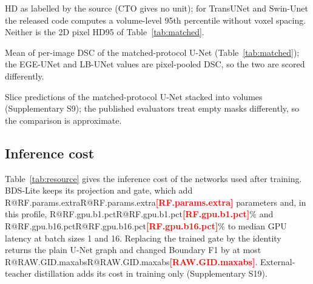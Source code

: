 \documentclass[fleqn,10pt,lineno]{wlpeerj}
\makeatletter
\newcommand{\R}[1]{\ifcsname R@#1\endcsname\csname R@#1\endcsname\else\textbf{\textcolor{red}{[#1]}}\fi}
\makeatother
\begin{document}
\begin{table}[!tb]
\centering
\begin{threeparttable}
{\small}
\begin{tablenotes}[flushleft]\footnotesize
\item[a] HD as labelled by the source (CTO gives no unit); for TransUNet and Swin-Unet the released code computes a volume-level 95th percentile without voxel spacing. Neither is the 2D pixel HD95 of Table~\ref{tab:matched}.
\item[b] Mean of per-image DSC of the matched-protocol U-Net (Table~\ref{tab:matched}); the EGE-UNet and LB-UNet values are pixel-pooled DSC, so the two are scored differently.
\item[c] Slice predictions of the matched-protocol U-Net stacked into volumes (Supplementary S9); the published evaluators treat empty masks differently, so the comparison is approximate.
\end{tablenotes}
\caption{\label{tab:published}Published results under their own protocols, and scores of the plain U-Net of this study (DSC on a 0--1 scale; dashes: not reported or not listed).}
\end{threeparttable}
\end{table}

\subsection*{Inference cost}
Table~\ref{tab:resource} gives the inference cost of the networks used after training. BDS-Lite keeps its projection and gate, which add \R{RF.params.extra} parameters and, in this profile, \R{RF.gpu.b1.pct}\% and \R{RF.gpu.b16.pct}\% to median GPU latency at batch sizes 1 and 16. Replacing the trained gate by the identity returns the plain U-Net graph and changed Boundary F1 by at most \R{RAW.GID.maxabs}. External-teacher distillation adds its cost in training only (Supplementary S19).

\begin{table}[!tb]
\centering
{\small}
\caption{\label{tab:resource}Inference cost for ISIC2018 input (3 channels, 2 classes, $224\times224$): parameters and forward-pass GFLOPs of the inference graph, and median latency in FP32 on the RTX 5060 Laptop GPU at batch sizes 1 (b1) and 16 (b16) and on one CPU thread. Percentages in the text are computed from unrounded medians. Full profile: Supplementary S19.}
\end{table}
\end{document}
